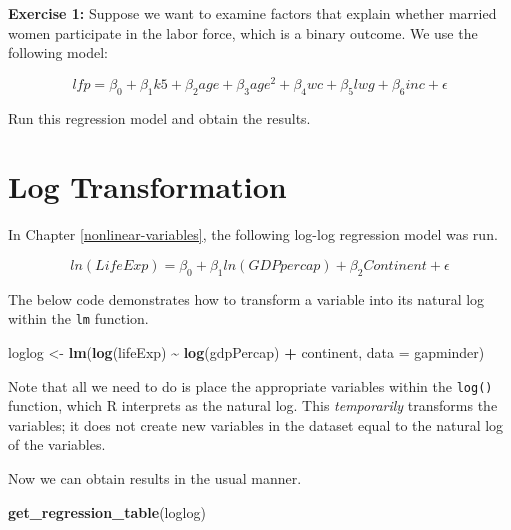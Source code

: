 \documentclass[
]{book}
\makeatletter
\newenvironment{Shaded}{\begin{snugshade}}{\end{snugshade}}
\newcommand{\AttributeTok}[1]{\textcolor[rgb]{0.27,0.27,0.27}{#1}}
\newcommand{\FunctionTok}[1]{\textcolor[rgb]{0.27,0.27,0.27}{\textbf{#1}}}
\newcommand{\NormalTok}[1]{#1}
\newcommand{\OtherTok}[1]{\textcolor[rgb]{0.37,0.37,0.37}{#1}}
\newcommand{\SpecialCharTok}[1]{\textcolor[rgb]{0.43,0.43,0.43}{\textbf{#1}}}
\newenvironment{kframe}{%
\medskip{}
\setlength{\fboxsep}{.8em}
 \def\at@end@of@kframe{}%
 \ifinner\ifhmode%
  \def\at@end@of@kframe{\end{minipage}}%
  \begin{minipage}{\columnwidth}%
 \fi\fi%
 \def\FrameCommand##1{\hskip\@totalleftmargin \hskip-\fboxsep
 \colorbox{shadecolor}{##1}\hskip-\fboxsep
     \hskip-\linewidth \hskip-\@totalleftmargin \hskip\columnwidth}%
 \MakeFramed {\advance\hsize-\width
   \@totalleftmargin\z@ \linewidth\hsize
   \@setminipage}}%
 {\par\unskip\endMakeFramed%
 \at@end@of@kframe}
\renewenvironment{Shaded}{\begin{kframe}}{\end{kframe}}
\newenvironment{rmdblock}[1]
  {\begin{shaded*}
  }
  {\end{shaded*}
  }
\newenvironment{learncheck}
  {\begin{rmdblock}{warning}}
  {\end{rmdblock}}
\makeatother
\begin{document}
\begin{learncheck}
\textbf{Exercise 1:} Suppose we want to examine factors that explain
whether married women participate in the labor force, which is a binary
outcome. We use the following model:

\begin{equation}
lfp = \beta_0 + \beta_1k5 + \beta_2age + \beta_3age^2 + \beta_4wc + \beta_5lwg + \beta_6inc + \epsilon
\end{equation}

Run this regression model and obtain the results.
\end{learncheck}

\hypertarget{log-transformation}{%
\section{Log Transformation}\label{log-transformation}}

In Chapter \ref{nonlinear-variables}, the following log-log regression model was run.

\begin{equation}
ln(LifeExp)=\beta_0 + \beta_1ln(GDPpercap) + \beta_2Continent + \epsilon
\end{equation}

The below code demonstrates how to transform a variable into its natural log within the \texttt{lm} function.

\begin{Shaded}
\begin{Highlighting}[]
\NormalTok{loglog }\OtherTok{\textless{}{-}} \FunctionTok{lm}\NormalTok{(}\FunctionTok{log}\NormalTok{(lifeExp) }\SpecialCharTok{\textasciitilde{}} \FunctionTok{log}\NormalTok{(gdpPercap) }\SpecialCharTok{+}\NormalTok{ continent, }\AttributeTok{data =}\NormalTok{ gapminder)}
\end{Highlighting}
\end{Shaded}

Note that all we need to do is place the appropriate variables within the \texttt{log()} function, which R interprets as the natural log. This \emph{temporarily} transforms the variables; it does not create new variables in the dataset equal to the natural log of the variables.

Now we can obtain results in the usual manner.

\begin{Shaded}
\begin{Highlighting}[]
\FunctionTok{get\_regression\_table}\NormalTok{(loglog)}
\end{Highlighting}
\end{Shaded}
\end{document}
